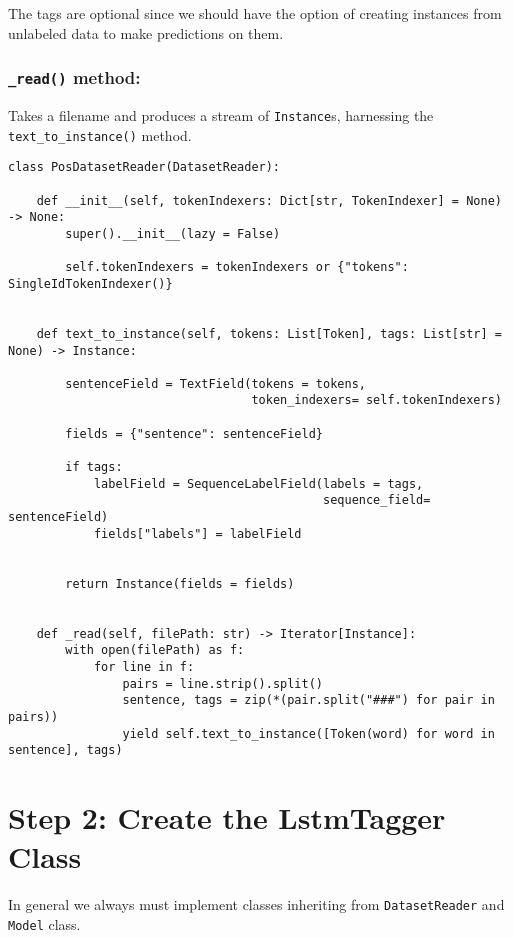 \documentclass[
]{article}
\begin{document}
The tags are optional since we should have the option of creating
instances from unlabeled data to make predictions on them.

\hypertarget{read-method}{%
\subsubsection{\texorpdfstring{\texttt{\_read()}
method:}{\_read() method:}}\label{read-method}}

Takes a filename and produces a stream of \texttt{Instance}s, harnessing
the \texttt{text\_to\_instance()} method.

\begin{verbatim}
class PosDatasetReader(DatasetReader):

    def __init__(self, tokenIndexers: Dict[str, TokenIndexer] = None) -> None:
        super().__init__(lazy = False)

        self.tokenIndexers = tokenIndexers or {"tokens": SingleIdTokenIndexer()}


    def text_to_instance(self, tokens: List[Token], tags: List[str] = None) -> Instance:

        sentenceField = TextField(tokens = tokens,
                                  token_indexers= self.tokenIndexers)

        fields = {"sentence": sentenceField}

        if tags:
            labelField = SequenceLabelField(labels = tags,
                                            sequence_field= sentenceField)
            fields["labels"] = labelField


        return Instance(fields = fields)


    def _read(self, filePath: str) -> Iterator[Instance]:
        with open(filePath) as f:
            for line in f:
                pairs = line.strip().split()
                sentence, tags = zip(*(pair.split("###") for pair in pairs))
                yield self.text_to_instance([Token(word) for word in sentence], tags)

\end{verbatim}

\hypertarget{step-2-create-the-lstmtagger-class}{%
\section{Step 2: Create the LstmTagger
Class}\label{step-2-create-the-lstmtagger-class}}

In general we always must implement classes inheriting from
\texttt{DatasetReader} and \texttt{Model} class.
\end{document}
